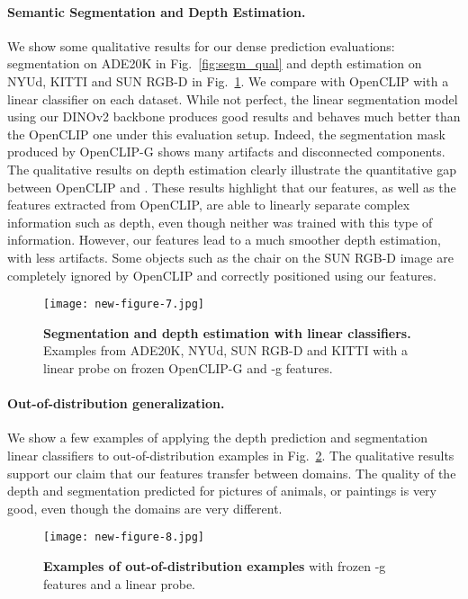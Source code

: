 \paragraph{Semantic Segmentation and Depth Estimation.}
We show some qualitative results for our dense prediction evaluations: segmentation on ADE20K in Fig.~\ref{fig:segm_qual} and depth estimation on NYUd, KITTI and SUN RGB-D in Fig.~\ref{fig:depth_qual}.
We compare \OURS{} with OpenCLIP with a linear classifier on each dataset.
While not perfect, the linear segmentation model using our DINOv2 backbone produces good results and behaves much better than the OpenCLIP one under this evaluation setup.
Indeed, the segmentation mask produced by OpenCLIP-G shows many artifacts and disconnected components. 
The qualitative results on depth estimation clearly illustrate the quantitative gap between OpenCLIP and \OURS.
These results highlight that our features, as well as the features extracted from OpenCLIP, are able to linearly separate complex information such as depth, even though neither was trained with this type of information.
However, our features lead to a much smoother depth estimation, with less artifacts.
Some objects such as the chair on the SUN RGB-D image are completely ignored by OpenCLIP and correctly positioned using our features.

\begin{figure}[t]
  \centering
  \texttt{[image: new-figure-7.jpg]}  
  \caption{
    \textbf{Segmentation and depth estimation with linear classifiers.} 
    Examples from ADE20K, NYUd, SUN RGB-D and KITTI with a linear probe on frozen OpenCLIP-G and \OURS-g features.
  }
  \label{fig:segm_qual}
  \label{fig:depth_qual}
\end{figure}


\paragraph{Out-of-distribution generalization.}
We show a few examples of applying the depth prediction and segmentation linear classifiers to out-of-distribution examples in Fig.~\ref{fig:depth_ood}.
The qualitative results support our claim that our features transfer between domains.
The quality of the depth and segmentation predicted for pictures of animals, or paintings is very good, even though the domains are very different.

\begin{figure}[t]
  \centering
  \texttt{[image: new-figure-8.jpg]} 
  \caption{
    \textbf{Examples of out-of-distribution examples} with frozen \OURS-g features and a linear probe.
  }
  \label{fig:depth_ood}
\end{figure}

